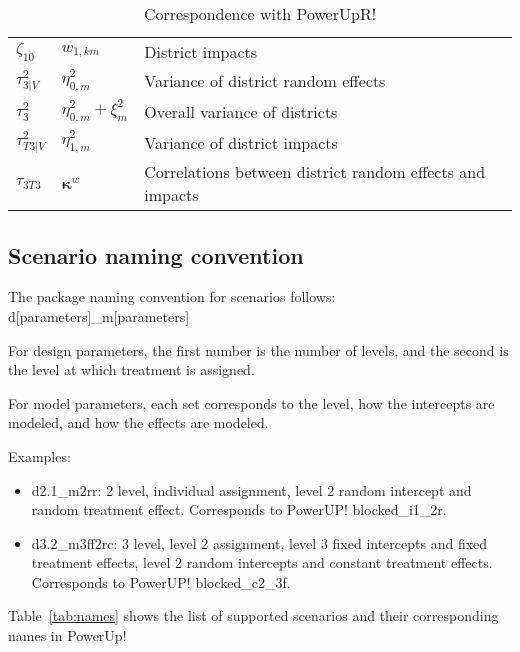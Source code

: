 \documentclass[12pt]{article}
\begin{document}
\begin{table}[p]
\begin{tabular}{l | l | l}
$\zeta_{10}$		& $w_{1,km}$					& District impacts\\
$\tau^2_{3|V}$		& $\eta^2_{0,m}$					& Variance of district random effects \\
$\tau^2_{3}$		& $\eta^2_{0,m} + \xi_{m}^2$		& Overall variance of districts\\
$\tau^2_{T3|V}$		& $\eta^2_{1,m}$					& Variance of district impacts\\
$\tau_{3T3}$		& $\boldsymbol{\kappa}^{w}$ 		& Correlations between district random effects and impacts \\
\end{tabular}
\caption{Correspondence with PowerUpR!\label{tab:powerup}}
\end{table}


\subsection{Scenario naming convention}

The package naming convention for scenarios follows:
d[parameters]\_m[parameters]

For design parameters, the first number is the number of levels, and the second is the level at which treatment is assigned.

For model parameters, each set corresponds to the level, how the intercepts are modeled, and how the effects are modeled.

Examples:
\begin{itemize}
\item d2.1\_m2rr: 2 level, individual assignment, level 2 random intercept and random treatment effect.  Corresponds to PowerUP! blocked\_i1\_2r.
\item d3.2\_m3ff2rc: 3 level, level 2 assignment, level 3 fixed intercepts and fixed treatment effects, level 2 random intercepts and constant treatment effects. Corresponds to PowerUP! blocked\_c2\_3f.
\end{itemize}

Table~\ref{tab:names} shows the list of supported scenarios and their corresponding names in PowerUp!
\end{document}
